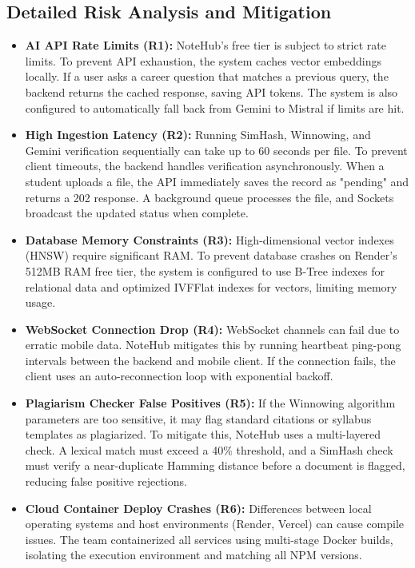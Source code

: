 \documentclass[12,Times new Roman,a4paper]{report}
\begin{document}
\subsection{Detailed Risk Analysis and Mitigation}
\begin{itemize}
    \item \textbf{AI API Rate Limits (R1):} NoteHub's free tier is subject to strict rate limits. To prevent API exhaustion, the system caches vector embeddings locally. If a user asks a career question that matches a previous query, the backend returns the cached response, saving API tokens. The system is also configured to automatically fall back from Gemini to Mistral if limits are hit.
    
    \item \textbf{High Ingestion Latency (R2):} Running SimHash, Winnowing, and Gemini verification sequentially can take up to 60 seconds per file. To prevent client timeouts, the backend handles verification asynchronously. When a student uploads a file, the API immediately saves the record as "pending" and returns a 202 response. A background queue processes the file, and Sockets broadcast the updated status when complete.
    
    \item \textbf{Database Memory Constraints (R3):} High-dimensional vector indexes (HNSW) require significant RAM. To prevent database crashes on Render's 512MB RAM free tier, the system is configured to use B-Tree indexes for relational data and optimized IVFFlat indexes for vectors, limiting memory usage.
    
    \item \textbf{WebSocket Connection Drop (R4):} WebSocket channels can fail due to erratic mobile data. NoteHub mitigates this by running heartbeat ping-pong intervals between the backend and mobile client. If the connection fails, the client uses an auto-reconnection loop with exponential backoff.
    
    \item \textbf{Plagiarism Checker False Positives (R5):} If the Winnowing algorithm parameters are too sensitive, it may flag standard citations or syllabus templates as plagiarized. To mitigate this, NoteHub uses a multi-layered check. A lexical match must exceed a 40\% threshold, and a SimHash check must verify a near-duplicate Hamming distance before a document is flagged, reducing false positive rejections.
    
    \item \textbf{Cloud Container Deploy Crashes (R6):} Differences between local operating systems and host environments (Render, Vercel) can cause compile issues. The team containerized all services using multi-stage Docker builds, isolating the execution environment and matching all NPM versions.
    

\end{itemize}
\end{document}

